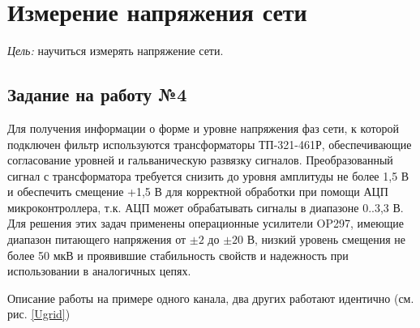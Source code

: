 
\section{Измерение напряжения сети}

{\it Цель:} научиться измерять напряжение сети.
 
\subsection{Задание на работу №4}

Для получения информации о форме и уровне напряжения фаз сети, к которой подключен фильтр используются трансформаторы ТП-321-461Р, 
обеспечивающие согласование уровней и гальваническую развязку сигналов. 
Преобразованный сигнал с трансформатора требуется снизить до уровня амплитуды не более 1,5 В и обеспечить смещение +1,5 В 
для корректной обработки при помощи АЦП микроконтроллера, т.к. АЦП может обрабатывать сигналы в диапазоне 0..3,3 В. 
Для решения этих задач применены операционные усилители OP297, имеющие диапазон питающего напряжения от $\pm2$ до $\pm20$ В, 
низкий уровень смещения не более 50 мкВ и проявившие стабильность свойств и надежность при использовании в аналогичных цепях. 

Описание работы на примере одного канала, два других работают идентично (см. рис. \ref{Ugrid})

